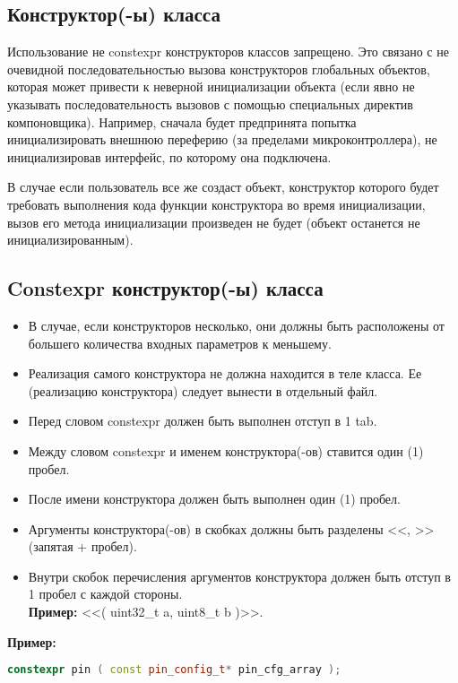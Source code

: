 \subsection{Конструктор(-ы) класса}\label{K:0:0}
Использование не constexpr конструкторов классов запрещено. Это связано с не очевидной последовательностью вызова конструкторов глобальных объектов, которая может привести к неверной инициализации объекта (если явно не указывать последовательность вызовов с помощью специальных директив компоновщика). Например, сначала будет предпринята попытка инициализировать внешнюю переферию (за пределами микроконтроллера), не инициализировав интерфейс, по которому она подключена.

В случае если пользователь все же создаст объект, конструктор которого будет требовать выполнения кода функции конструктора во время инициализации, вызов его метода инициализации произведен не будет (объект останется не инициализированным).

\subsection{Constexpr конструктор(-ы) класса}\label{K:0:1}
\begin{itemize}
	\item В случае, если конструкторов несколько, они должны быть расположены от большего количества входных параметров к меньшему.
	\item Реализация самого конструктора не должна находится в теле класса. Ее (реализацию конструктора) следует вынести в отдельный файл.
	\item Перед словом constexpr должен быть выполнен отступ в 1 tab.	
	\item Между словом constexpr и именем конструктора(-ов) ставится один (1) пробел.
	\item После имени конструктора должен быть выполнен один (1) пробел. 
	\item Аргументы конструктора(-ов) в скобках должны быть разделены <<, >> (запятая + пробел).
	\item Внутри скобок перечисления аргументов конструктора должен быть отступ в 1 пробел с каждой стороны.\\\textbf{Пример: } <<( uint32\_t a, uint8\_t b )>>.
\end{itemize}
\textbf{Пример:}\begin{lstlisting}[language=C++, frame=tlBR, basicstyle=\fontsize{10}{10}\ttfamily]
	constexpr pin ( const pin_config_t* pin_cfg_array );
\end{lstlisting}

